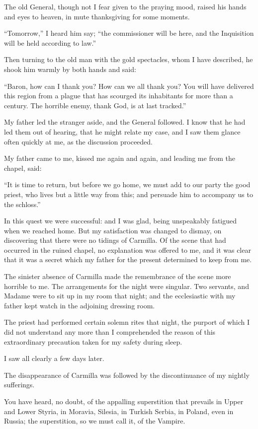 \documentclass[11pt,twoside,makeidx,hidelinks,]{memoir}
\begin{document}
The old General, though not I fear given to the praying mood, raised his
hands and eyes to heaven, in mute thanksgiving for some moments.

``Tomorrow,'' I heard him say; ``the commissioner will be here, and the
Inquisition will be held according to law.''

Then turning to the old man with the gold spectacles, whom I have
described, he shook him warmly by both hands and said:

``Baron, how can I thank you? How can we all thank you? You will have
delivered this region from a plague that has scourged its inhabitants
for more than a century. The horrible enemy, thank God, is at
last tracked.''

My father led the stranger aside, and the General followed. I know that
he had led them out of hearing, that he might relate my case, and I saw
them glance often quickly at me, as the discussion proceeded.

My father came to me, kissed me again and again, and leading me from the
chapel, said:

``It is time to return, but before we go home, we must add to our party
the good priest, who lives but a little way from this; and persuade him
to accompany us to the schloss.''

In this quest we were successful: and I was glad, being unspeakably
fatigued when we reached home. But my satisfaction was changed to
dismay, on discovering that there were no tidings of Carmilla. Of the
scene that had occurred in the ruined chapel, no explanation was offered
to me, and it was clear that it was a secret which my father for the
present determined to keep from me.

The sinister absence of Carmilla made the remembrance of the scene more
horrible to me. The arrangements for the night were singular. Two
servants, and Madame were to sit up in my room that night; and the
ecclesiastic with my father kept watch in the adjoining dressing room.

The priest had performed certain solemn rites that night, the purport of
which I did not understand any more than I comprehended the reason of
this extraordinary precaution taken for my safety during sleep.

I saw all clearly a few days later.

The disappearance of Carmilla was followed by the discontinuance of my
nightly sufferings.

You have heard, no doubt, of the appalling superstition that prevails in
Upper and Lower Styria, in Moravia, Silesia, in Turkish Serbia, in
Poland, even in Russia; the superstition, so we must call it, of
the Vampire.
\end{document}
